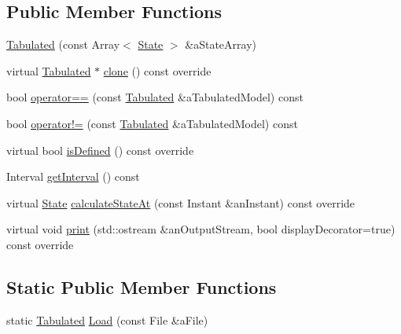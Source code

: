 \subsection*{Public Member Functions}
\begin{DoxyCompactItemize}
\item 
\hyperlink{classlibrary_1_1astro_1_1trajectory_1_1models_1_1_tabulated_a01461e23723b83bed5dcdd9cac977d14}{Tabulated} (const Array$<$ \hyperlink{classlibrary_1_1astro_1_1trajectory_1_1_state}{State} $>$ \&a\+State\+Array)
\item 
virtual \hyperlink{classlibrary_1_1astro_1_1trajectory_1_1models_1_1_tabulated}{Tabulated} $\ast$ \hyperlink{classlibrary_1_1astro_1_1trajectory_1_1models_1_1_tabulated_a192cfb0ceb4a11d02578adc9702cabc1}{clone} () const override
\item 
bool \hyperlink{classlibrary_1_1astro_1_1trajectory_1_1models_1_1_tabulated_abd07a40a7c4d5dacc8e454d78680b683}{operator==} (const \hyperlink{classlibrary_1_1astro_1_1trajectory_1_1models_1_1_tabulated}{Tabulated} \&a\+Tabulated\+Model) const
\item 
bool \hyperlink{classlibrary_1_1astro_1_1trajectory_1_1models_1_1_tabulated_af6d469ba219acf75e32d64ccebda31f2}{operator!=} (const \hyperlink{classlibrary_1_1astro_1_1trajectory_1_1models_1_1_tabulated}{Tabulated} \&a\+Tabulated\+Model) const
\item 
virtual bool \hyperlink{classlibrary_1_1astro_1_1trajectory_1_1models_1_1_tabulated_ae967e30f6de74405671f992a5920883f}{is\+Defined} () const override
\item 
Interval \hyperlink{classlibrary_1_1astro_1_1trajectory_1_1models_1_1_tabulated_a8c0710d386728b7443469a49c5571e18}{get\+Interval} () const
\item 
virtual \hyperlink{classlibrary_1_1astro_1_1trajectory_1_1_state}{State} \hyperlink{classlibrary_1_1astro_1_1trajectory_1_1models_1_1_tabulated_a6d23f5721930d9e885eb3b763ab3390a}{calculate\+State\+At} (const Instant \&an\+Instant) const override
\item 
virtual void \hyperlink{classlibrary_1_1astro_1_1trajectory_1_1models_1_1_tabulated_a3eae12849178fe43d30a620edceddd8e}{print} (std\+::ostream \&an\+Output\+Stream, bool display\+Decorator=true) const override
\end{DoxyCompactItemize}
\subsection*{Static Public Member Functions}
\begin{DoxyCompactItemize}
\item 
static \hyperlink{classlibrary_1_1astro_1_1trajectory_1_1models_1_1_tabulated}{Tabulated} \hyperlink{classlibrary_1_1astro_1_1trajectory_1_1models_1_1_tabulated_a63c053c7a308930aa03b354292c85c0f}{Load} (const File \&a\+File)
\end{DoxyCompactItemize}
